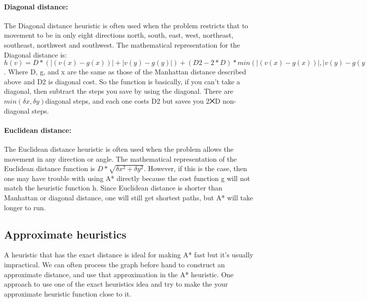 \documentclass[12pt]{article}
\begin{document}
\paragraph{Diagonal distance: }
The Diagonal distance heuristic is often used when the problem restricts that to movement to be in only eight directions north, south, east, west, northeast, southeast, northwest and southwest. The mathematical representation for the Diagonal distance is: \begin{math} h(v) = D*(|(v(x) - g(x))| + |v(y) - g(y)|) + (D2 - 2 * D) * min(|(v(x) - g(x))|, |v(y) - g(y)|)\end{math}. Where D, g, and x are the same as those of the Manhattan distance described above and D2 is diagonal cost. So the function is basically, if you can’t take a diagonal, then subtract the steps you save by using the diagonal. There are \begin{math} min(\delta x, \delta y) \end{math}diagonal steps, and each one costs D2 but saves you 2⨉D non-diagonal steps.

\paragraph{Euclidean distance: }
The Euclidean distance heuristic is often used when the problem allows the movement in any direction or angle. The mathematical representation of the Euclidean distance function is \begin{math}D * \sqrt{\delta x^2 + \delta y^2}\end{math}. However, if this is the case, then one may have trouble with using A* directly because the cost function g will not match the heuristic function h. Since Euclidean distance is shorter than Manhattan or diagonal distance, one will still get shortest paths, but A* will take longer to run.

\newpage
\subsection{Approximate heuristics}
A heuristic that has the exact distance is ideal for making A* fast but it’s usually impractical. We can often process the graph before hand to construct an approximate distance, and use that approximation in the A* heuristic. One approach to use one of the exact heuristics idea and try to make the your approximate heuristic function close to it.
\end{document}
